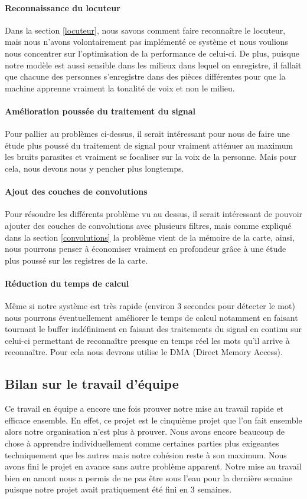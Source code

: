 \documentclass[a4paper,11pt]{article}
\begin{document}
\paragraph{Reconnaissance du locuteur}
Dans la section \ref{locuteur}, nous savons comment faire reconnaître le locuteur, mais nous n'avons volontairement pas implémenté ce système et nous voulions nous concentrer sur l'optimisation de la performance de celui-ci. De plus, puisque notre modèle est aussi sensible dans les milieux dans lequel on enregistre, il fallait que chacune des personnes s'enregistre dans des pièces différentes pour que la machine apprenne vraiment la tonalité de voix et non le milieu.
\paragraph{Amélioration poussée du traitement du signal}
Pour pallier au problèmes ci-dessus, il serait intéressant pour nous de faire une étude plus poussé du traitement de signal pour vraiment atténuer au maximum les bruits parasites et vraiment se focaliser sur la voix de la personne. Mais pour cela, nous devons nous y pencher plus longtemps.
\paragraph{Ajout des couches de convolutions}
Pour résoudre les différents problème vu au dessus, il serait intéressant de pouvoir ajouter des couches de convolutions avec plusieurs filtres, mais comme expliqué dans la section \ref{convolutions} la problème vient de la mémoire de la carte, ainsi, nous pourrons penser à économiser vraiment en profondeur grâce à une étude plus poussé sur les registres de la carte.
\paragraph{Réduction du temps de calcul}
Même si notre système est très rapide (environ 3 secondes pour détecter le mot) nous pourrons éventuellement améliorer le temps de calcul notamment en faisant tournant le buffer indéfiniment en faisant des traitements du signal en continu sur celui-ci permettant de reconnaître presque en temps réel les mots qu'il arrive à reconnaître. Pour cela nous devrons utilise le DMA (Direct Memory Access).
			
\subsection{Bilan sur le travail d’équipe}	
Ce travail en équipe a encore une fois prouver notre mise au travail rapide et efficace ensemble. En effet, ce projet est le cinquième projet que l’on fait ensemble alors notre organisation n’est plus à prouver. Nous avons encore beaucoup de chose à apprendre individuellement comme certaines parties plus exigeantes techniquement que les autres mais notre cohésion reste à son maximum. Nous avons fini le projet en avance sans autre problème apparent. Notre mise au travail bien en amont nous a permis de ne pas être sous l’eau pour la dernière semaine puisque notre projet avait pratiquement été fini en 3 semaines.
\end{document}
